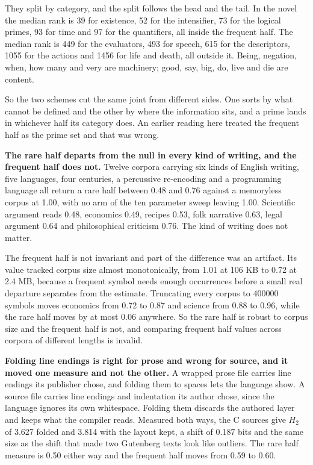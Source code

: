They split by category, and the split follows the head and the tail. In the novel the median rank is 39 for existence, 52 for the intensifier, 73 for the logical primes, 93 for time and 97 for the quantifiers, all inside the frequent half. The median rank is 449 for the evaluators, 493 for speech, 615 for the descriptors, 1055 for the actions and 1456 for life and death, all outside it. Being, negation, when, how many and very are machinery; good, say, big, do, live and die are content.

So the two schemes cut the same joint from different sides. One sorts by what cannot be defined and the other by where the information sits, and a prime lands in whichever half its category does. An earlier reading here treated the frequent half as the prime set and that was wrong.

\textbf{The rare half departs from the null in every kind of writing, and the frequent half does not.} Twelve corpora carrying six kinds of English writing, five languages, four centuries, a percussive re-encoding and a programming language all return a rare half between 0.48 and 0.76 against a memoryless corpus at 1.00, with no arm of the ten parameter sweep leaving 1.00. Scientific argument reads 0.48, economics 0.49, recipes 0.53, folk narrative 0.63, legal argument 0.64 and philosophical criticism 0.76. The kind of writing does not matter.

The frequent half is not invariant and part of the difference was an artifact. Its value tracked corpus size almost monotonically, from 1.01 at 106 KB to 0.72 at 2.4 MB, because a frequent symbol needs enough occurrences before a small real departure separates from the estimate. Truncating every corpus to 400000 symbols moves economics from 0.72 to 0.87 and science from 0.88 to 0.96, while the rare half moves by at most 0.06 anywhere. So the rare half is robust to corpus size and the frequent half is not, and comparing frequent half values across corpora of different lengths is invalid.

\textbf{Folding line endings is right for prose and wrong for source, and it moved one measure and not the other.} A wrapped prose file carries line endings its publisher chose, and folding them to spaces lets the language show. A source file carries line endings and indentation its author chose, since the language ignores its own whitespace. Folding them discards the authored layer and keeps what the compiler reads. Measured both ways, the C sources give \(H_2\) of 3.627 folded and 3.814 with the layout kept, a shift of 0.187 bits and the same size as the shift that made two Gutenberg texts look like outliers. The rare half measure is 0.50 either way and the frequent half moves from 0.59 to 0.60.

